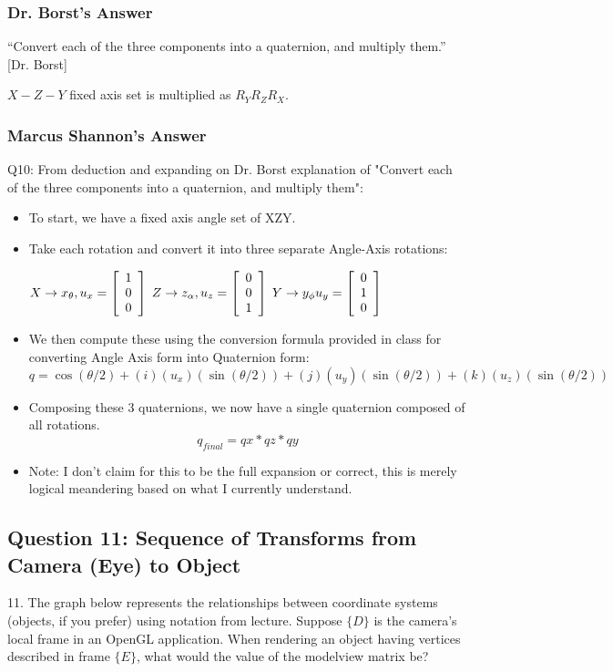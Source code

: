 \documentclass[11pt]{article}
\begin{document}
\begin{spacing}{1.2}
\subsubsection{Dr. Borst's Answer}

``Convert each of the three components into a quaternion, and multiply them.'' [Dr. Borst]

$X-Z-Y$ fixed axis set is multiplied as $R_YR_ZR_X$.

\subsubsection{Marcus Shannon's Answer}
Q10: From deduction and expanding on Dr. Borst explanation of  "Convert each of the three components into a quaternion, and multiply them":

\begin{itemize}
    \item To start, we have a fixed axis angle set of XZY.
    \item Take each rotation and convert it into three separate Angle-Axis rotations:
    
        $ X \to x_\theta, u_x =  \left[ \begin{array}{c} 1\cr 0\cr 0\cr\end{array} \right]$\qquad
        $ Z \to z_\alpha, u_z =  \left[ \begin{array}{c} 0\cr 0\cr 1\cr\end{array} \right]$\qquad
        $ Y \to y_\phi u_y =  \left[ \begin{array}{c} 0\cr 1\cr 0\cr\end{array} \right]$
        
    	\item We then compute these using the conversion formula provided in class for converting Angle Axis form into Quaternion form:
        $$q = \cos(\theta/2) + (i)(u_x)(\sin(\theta/2)) + (j)(u_y)(\sin(\theta/2)) + (k)(u_z)(\sin(\theta/2))$$
    \item Composing these 3 quaternions, we now have a single quaternion composed of all rotations.
        $$q_{final} = qx * qz * qy$$
    \item Note: I don't claim for this to be the full expansion or correct, this is merely logical meandering based on what I currently understand.
    \end{itemize}
    
\subsection{Question 11:  Sequence of Transforms from Camera (Eye) to Object}
11.  The graph below represents the relationships between coordinate systems (objects, if you prefer) using notation from lecture.  Suppose $\{D\}$ is the camera's local frame in an OpenGL application.  When rendering an object having vertices described in frame $\{E\}$, what would the value of the modelview matrix be?


\end{spacing}
\end{document}
